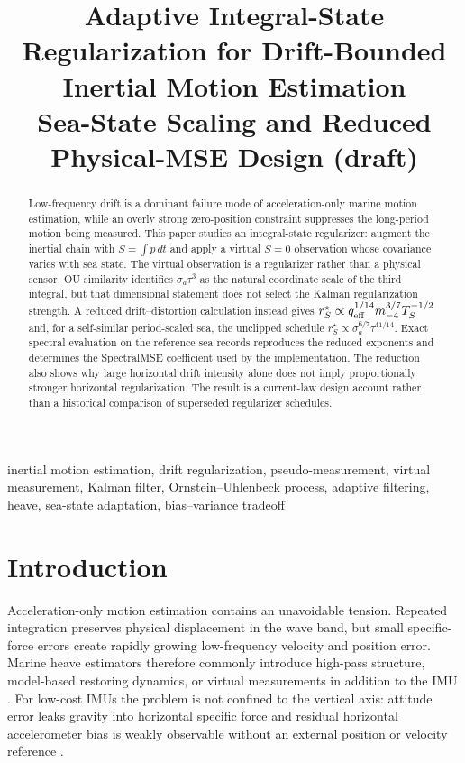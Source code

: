 \documentclass[conference]{IEEEtran}
\title{Adaptive Integral-State Regularization for Drift-Bounded Inertial Motion Estimation\\
\large Sea-State Scaling and Reduced Physical-MSE Design (draft)}
\author{%
  \IEEEauthorblockN{Mikhail S. Grushinskiy}
  \IEEEauthorblockA{Independent Researcher, USA, Fair Lawn\\
  Bareboat Necessities GitHub Project\\
  Email: mgrouch@users.github.com}%
}
\theoremstyle{remark}
\begin{document}
\maketitle

\begin{abstract}
Low-frequency drift is a dominant failure mode of acceleration-only marine
motion estimation, while an overly strong zero-position constraint suppresses
the long-period motion being measured.  This paper studies an integral-state
regularizer: augment the inertial chain with $S=\int p\,dt$ and apply a virtual
$S=0$ observation whose covariance varies with sea state.  The virtual
observation is a regularizer rather than a physical sensor.  OU similarity
identifies $\sigma_a\tau^3$ as the natural coordinate scale of the third
integral, but that dimensional statement does not select the Kalman
regularization strength.  A reduced drift--distortion calculation instead gives
$r_S^\star\propto q_{\rm eff}^{1/14}m_{-4}^{3/7}T_S^{-1/2}$ and, for a
self-similar period-scaled sea, the unclipped schedule
$r_S^\star\propto\sigma_a^{6/7}\tau^{41/14}$.  Exact spectral evaluation on
the reference sea records reproduces the reduced exponents and determines the
SpectralMSE coefficient used by the implementation.  The reduction also shows
why large horizontal drift intensity alone does not imply proportionally
stronger horizontal regularization.  The result is a current-law design account
rather than a historical comparison of superseded regularizer schedules.
\end{abstract}

\begin{IEEEkeywords}
inertial motion estimation, drift regularization, pseudo-measurement, virtual
measurement, Kalman filter, Ornstein--Uhlenbeck process, adaptive filtering,
heave, sea-state adaptation, bias--variance tradeoff
\end{IEEEkeywords}

\section{Introduction}

Acceleration-only motion estimation contains an unavoidable tension.  Repeated
integration preserves physical displacement in the wave band, but small
specific-force errors create rapidly growing low-frequency velocity and
position error.  Marine heave estimators therefore commonly introduce
high-pass structure, model-based restoring dynamics, or virtual measurements in
addition to the IMU
\cite{Kuechler2011_HeaveAcceleration,Auestad2013_HeaveStrapdownIMU,Reis2023_DiscreteKalmanHeave}.
For low-cost IMUs the problem is not confined to the vertical axis: attitude
error leaks gravity into horizontal specific force and residual horizontal
accelerometer bias is weakly observable without an external position or
velocity reference \cite{YurovskyKudinov2025_IMUwaves}.
\end{document}

